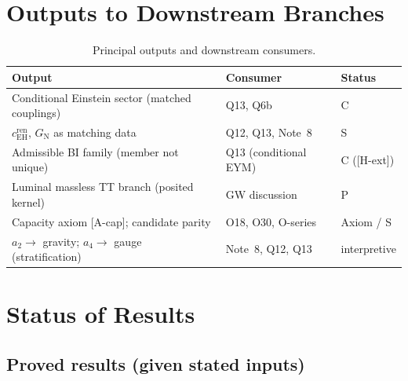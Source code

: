 \documentclass[11pt,a4paper]{article}
\theoremstyle{definition}
\newcommand{\GN}{G_{\mathrm{N}}}
\newcommand{\cEH}{c_{\mathrm{EH}}}
\begin{document}
  \section{Outputs to Downstream Branches}
    \label{sec:outputs}

    \begin{table}[ht]
      \centering
      \caption{Principal outputs and downstream consumers.}
      \label{tab:outputs}
      \renewcommand{\arraystretch}{1.3}
      \begin{tabular}{@{}p{6.2cm}p{4.2cm}l@{}}
        \toprule
        Output & Consumer & Status \\
        \midrule
        Conditional Einstein sector (matched couplings) & Q13, Q6b & C \\
        $\cEH^{\mathrm{ren}}$, $\GN$ as matching data & Q12, Q13, Note~8 & S \\
        Admissible BI family (member not unique) & Q13 (conditional EYM) & C ([H-ext]) \\
        Luminal massless TT branch (posited kernel) & GW discussion & P \\
        Capacity axiom [A-cap]; candidate parity & O18, O30, O-series & Axiom / S \\
        $a_2 \to$ gravity; $a_4 \to$ gauge (stratification) & Note~8, Q12, Q13 & interpretive \\
        \bottomrule
      \end{tabular}
    \end{table}

  \section{Status of Results}
    \label{sec:status}

    \subsection{Proved results (given stated inputs)}
      \label{sec:proved}
\end{document}
